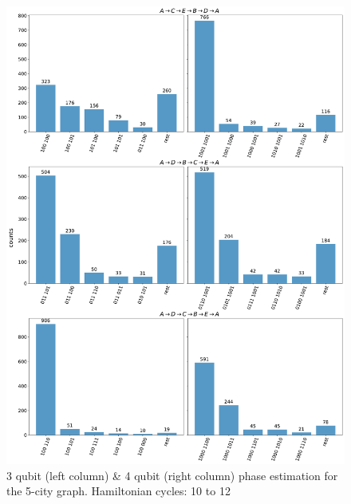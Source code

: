 \documentclass[msc,oneside]{ubcthesis}
\begin{document}
	\begin{figure}[!h]
		\centering
		\includegraphics[width=\textwidth,height=0.9\textheight,keepaspectratio]{"graphics/10-12-5city"}
		\caption{3 qubit (left column) \& 4 qubit (right column) phase estimation for the 5-city graph. Hamiltonian cycles: 10 to 12}
		\label{fig:5-city-10-12}
	\end{figure}		
	
\end{document}
